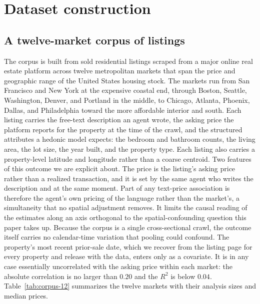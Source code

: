 
\section{Dataset construction}
\label{sec:data}

\subsection{A twelve-market corpus of listings}

The corpus is built from sold residential listings scraped from a major online
real estate platform across twelve metropolitan markets that span the price and
geographic range of the United States housing stock. The markets run from San
Francisco and New York at the expensive coastal end, through Boston, Seattle,
Washington, Denver, and Portland in the middle, to Chicago, Atlanta, Phoenix,
Dallas, and Philadelphia toward the more affordable interior and south. Each
listing carries the free-text description an agent wrote, the asking price the
platform reports for the property at the time of the crawl, and the structured
attributes a hedonic model expects: the bedroom and bathroom counts, the living
area, the lot size, the year built, and the property type. Each listing also
carries a property-level latitude and longitude rather than a coarse centroid. Two
features of this outcome we are explicit about. The price is
the listing's asking price rather than a realized transaction, and it is set by the
same agent who writes the description and at the same moment. Part of any
text-price association is therefore the agent's own pricing of the language rather
than the market's, a simultaneity that no spatial adjustment removes. It limits the
causal reading of the estimates along an axis orthogonal to the spatial-confounding
question this paper takes up. Because the corpus is a single cross-sectional crawl,
the outcome itself carries no calendar-time variation that pooling could confound.
The property's most recent prior-sale date, which we recover from the listing page
for every property and release with the data, enters only as a covariate. It is in
any case essentially uncorrelated with the asking price within each market: the
absolute correlation is no larger than $0.20$ and the $R^2$ is below $0.04$.
Table~\ref{tab:corpus-12} summarizes the twelve markets with their analysis sizes
and median prices.

